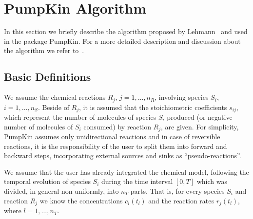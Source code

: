 
\chapter{PumpKin Algorithm}
\label{sec_6}

In this section we briefly describe the algorithm proposed by Lehmann~\cite{Lehmann2004/JAC} and used in the package PumpKin. For a more detailed description and discussion about the algorithm we refer to~\cite{Lehmann2004/JAC}.


\section{Basic Definitions}
\label{sec_6_1}
We assume the chemical reactions $R_j$, $j = 1, \ldots, n_R$, involving species $S_i$, $i = 1,\ldots, n_S$. Beside of $R_j$, it is assumed that the stoichiometric coefficients $s_{ij}$, which represent the number of molecules of species $S_i$ produced (or negative number of molecules of $S_i$ consumed) by reaction $R_j$, are given. For simplicity, PumpKin assumes only unidirectional reactions and in case of reversible reactions, it is the responsibility of the user to split them into forward and backward steps, incorporating external sources and sinks as ``pseudo-reactions''.

We assume that the user has already integrated the chemical model, following the temporal evolution of species $S_i$ during the time interval $\left[0, T\right]$ which was divided, in general non-uniformly, into $n_T$ parts. That is, for every species $S_i$ and reaction $R_j$ we know the concentrations $c_i(t_l)$ and the reaction rates $r_j(t_l)$, where $l = 1,\ldots,n_T$.

